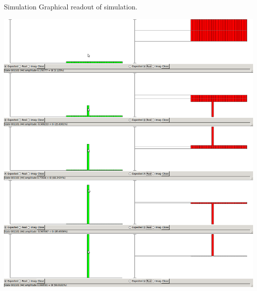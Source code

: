 \documentclass{beamer}
\begin{document}
\begin{frame}{Simulation}
Graphical readout of simulation.
\begin{center}
\includegraphics[scale=0.11]{simulate}
\end{center}
\end{frame}
\end{document}
